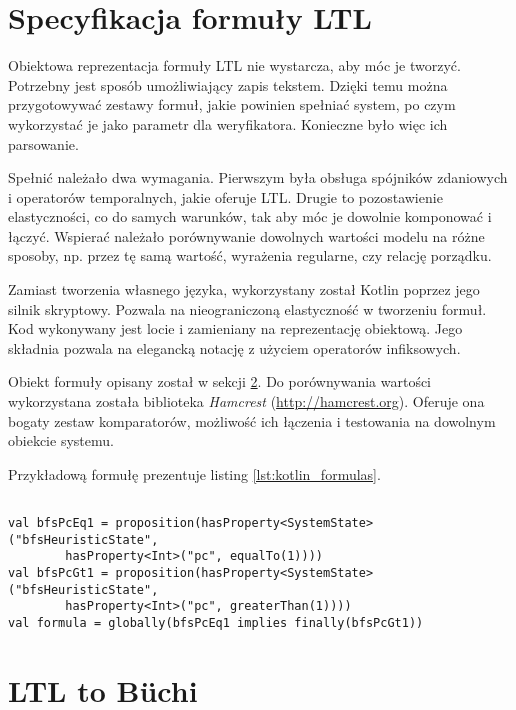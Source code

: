 \section{Specyfikacja formuły LTL} \label{sec:LTL_formula_spec}

Obiektowa reprezentacja formuły LTL nie wystarcza, aby móc je tworzyć.
Potrzebny jest sposób umożliwiający zapis tekstem.
Dzięki temu można przygotowywać zestawy formuł, jakie powinien spełniać system, po czym wykorzystać je jako parametr dla weryfikatora.
Konieczne było więc ich parsowanie.

Spełnić należało dwa wymagania.
Pierwszym była obsługa spójników zdaniowych i operatorów temporalnych, jakie oferuje LTL.
Drugie to pozostawienie elastyczności, co do samych warunków, tak aby móc je dowolnie komponować i łączyć.
Wspierać należało porównywanie dowolnych wartości modelu na różne sposoby, np. przez tę samą wartość, wyrażenia regularne, czy relację porządku.

Zamiast tworzenia własnego języka, wykorzystany został Kotlin poprzez jego silnik skryptowy.
Pozwala na nieograniczoną elastyczność w tworzeniu formuł.
Kod wykonywany jest locie i zamieniany na reprezentację obiektową.
Jego składnia pozwala na elegancką notację z użyciem operatorów infiksowych.

Obiekt formuły opisany został w sekcji \ref{sec:ltl2buchi}.
Do porównywania wartości wykorzystana została biblioteka \textit{Hamcrest} (\url{http://hamcrest.org}).
Oferuje ona bogaty zestaw komparatorów, możliwość ich łączenia i testowania na dowolnym obiekcie systemu.

Przykładową formułę prezentuje listing \ref{lst:kotlin_formulas}.

\begin{minipage}{\linewidth}
\begin{lstlisting}[caption={Przykładowa formuła LTL w języku Kotlin.},captionpos=b,label={lst:kotlin_formulas}]

val bfsPcEq1 = proposition(hasProperty<SystemState>("bfsHeuristicState", 
        hasProperty<Int>("pc", equalTo(1))))
val bfsPcGt1 = proposition(hasProperty<SystemState>("bfsHeuristicState",
        hasProperty<Int>("pc", greaterThan(1))))
val formula = globally(bfsPcEq1 implies finally(bfsPcGt1))

\end{lstlisting}
\end{minipage}


\section{LTL to Büchi} \label{sec:ltl2buchi}

